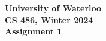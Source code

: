 \documentclass[10pt]{article}
\begin{document}
\begin{center}
  {\Large\bf University of Waterloo}\\ \vspace{3mm}
  {\Large\bf CS 486, Winter 2024}\\ \vspace{2mm}
  {\Large\bf Assignment 1}\\ \vspace{3mm}
\end{center}

\def\question#1{\item[\bf #1.]}
\def\part#1{\item[\bf #1)]}
\newcommand{\pc}[1]{\mbox{\textbf{#1}}} %

\end{document}
